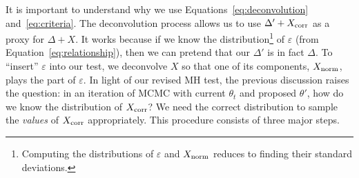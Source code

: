 \documentclass{article}
\begin{document}
It is important to understand why we use Equations~\ref{eq:deconvolution} and~\ref{eq:criteria}. The
deconvolution process allows us to use $\Delta' + X_{\rm corr}$ as a proxy for $\Delta + X$. It
works because if we know the distribution\footnote{Computing the distributions of $\varepsilon$ and
$X_{\rm norm}$ reduces to finding their standard deviations.} of $\varepsilon$ (from
Equation~\ref{eq:relationship}), then we can pretend that our $\Delta'$ is in fact $\Delta$. To
``insert'' $\varepsilon$ into our test, we deconvolve $X$ so that one of its components, $X_{\rm
norm}$, plays the part of $\varepsilon$. In light of our revised MH test, the previous discussion
raises the question: in an iteration of MCMC with current $\theta_t$ and proposed $\theta'$, how do
we know the distribution of $X_{\rm corr}$? We need the correct distribution to sample the
\emph{values} of $X_{\rm corr}$ appropriately. This procedure consists of three major steps.
\end{document}

